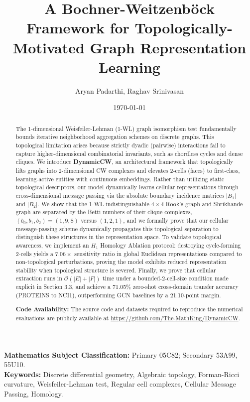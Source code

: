 \documentclass[11pt, letterpaper]{article}
\title{A Bochner-Weitzenb\"ock Framework for Topologically-Motivated Graph Representation Learning}
\author{Aryan Padarthi, Raghav Srinivasan}
\date{\today}
\begin{document}
\maketitle

\begin{abstract}
The 1-dimensional Weisfeiler-Lehman (1-WL) graph isomorphism test fundamentally bounds iterative neighborhood aggregation schemes on discrete graphs. This topological limitation arises because strictly dyadic (pairwise) interactions fail to capture higher-dimensional combinatorial invariants, such as chordless cycles and dense cliques. We introduce \textbf{DynamicCW}, an architectural framework that topologically lifts graphs into 2-dimensional CW complexes and elevates 2-cells (faces) to first-class, learning-active entities with continuous embeddings. Rather than utilizing static topological descriptors, our model dynamically learns cellular representations through cross-dimensional message passing via the absolute boundary incidence matrices $|B_1|$ and $|B_2|$. We show that the 1-WL-indistinguishable $4\times4$ Rook's graph and Shrikhande graph are separated by the Betti numbers of their clique complexes, $(b_0,b_1,b_2)=(1,9,8)$ versus $(1,2,1)$, and we formally prove that our cellular message-passing scheme dynamically propagates this topological separation to distinguish these structures in the representation space. To validate topological awareness, we implement an $H_1$ Homology Ablation protocol: destroying cycle-forming 2-cells yields a $7.06\times$ sensitivity ratio in global Euclidean representations compared to non-topological perturbations, proving the model exhibits reduced representation stability when topological structure is severed. Finally, we prove that cellular extraction runs in $\mathcal{O}(|E|+|F|)$ time under a bounded-2-cell-size condition made explicit in Section 3.3, and achieve a 71.05\% zero-shot cross-domain transfer accuracy (PROTEINS to NCI1), outperforming GCN baselines by a 21.10-point margin.

\vspace{0.2cm}
\noindent \textbf{Code Availability:} The source code and datasets required to reproduce the numerical evaluations are publicly available at \url{https://github.com/The-MathKing/DynamicCW}.
\end{abstract}

\vspace{0.5cm}
\noindent \textbf{Mathematics Subject Classification:} Primary 05C82; Secondary 53A99, 55U10. \\
\textbf{Keywords:} Discrete differential geometry, Algebraic topology, Forman-Ricci curvature, Weisfeiler-Lehman test, Regular cell complexes, Cellular Message Passing, Homology.
\end{document}
